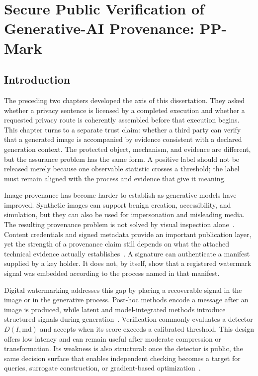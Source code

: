 \chapter[Secure Public Verification of Generative-AI Provenance]{Secure Public Verification of Generative-AI Provenance: PP-Mark}
\label{ch:pp-mark}

\section{Introduction}
\label{sec:ch4-introduction}

The preceding two chapters developed the \AuditablePrivacy{} axis of this
dissertation.  They asked whether a privacy sentence is licensed by a completed
execution and whether a requested privacy route is coherently assembled before
that execution begins.  This chapter turns to a separate trust claim: whether a
third party can verify that a generated image is accompanied by evidence
consistent with a declared generation context.  The protected object, mechanism,
and evidence are different, but the assurance problem has the same form.  A
positive label should not be released merely because one observable statistic
crosses a threshold; the label must remain aligned with the process and evidence
that give it meaning.

Image provenance has become harder to establish as generative models have
improved.  Synthetic images can support benign creation, accessibility, and
simulation, but they can also be used for impersonation and misleading media.
The resulting provenance problem is not solved by visual inspection
alone~\cite{chesney2019deepfakes,longpre2024provenance}.  Content credentials and
signed metadata provide an important publication layer, yet the strength of a
provenance claim still depends on what the attached technical evidence actually
establishes~\cite{c2pa2026spec}.  A signature can authenticate a manifest supplied
by a key holder.  It does not, by itself, show that a registered watermark signal
was embedded according to the process named in that manifest.

Digital watermarking addresses this gap by placing a recoverable signal in the
image or in the generative process.  Post-hoc methods encode a message after an
image is produced, while latent and model-integrated methods introduce structured
signals during generation~\cite{zhu2018hidden,tancik2020stegastamp,
wen2023treerings,fernandez2023stablesignature}.  Verification commonly evaluates a
detector $D(I,\mathrm{md})$ and accepts when its score exceeds a calibrated
threshold.  This design offers low latency and can remain useful after moderate
compression or transformation.  Its weakness is also structural: once the
detector is public, the same decision surface that enables independent checking
becomes a target for queries, surrogate construction, or gradient-based
optimization~\cite{jiang2023evading,muller2025blackbox,lin2025crack}.

